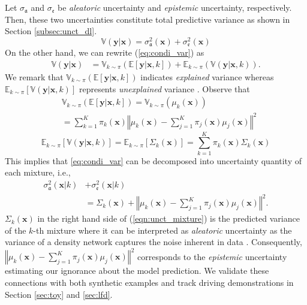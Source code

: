 \documentclass[letterpaper, 10 pt, conference]{ieeeconf}  %
\def\Bx{\mathbf{x}} \def\By{\mathbf{y}} \def\Bp{\mathbf{p}}
\begin{document}
Let $\sigma_{\mathfrak{a}}$ and 
$\sigma_{\mathfrak{e}}$ be \textit{aleatoric} uncertainty 
and \textit{epistemic} uncertainty, respectively. 
Then, these two uncertainties constitute total predictive variance
as shown in Section \ref{subsec:unct_dl}. 
\[
	\mathbb{V}(\mathbf{y}|\mathbf{x})
		=\sigma_{\mathfrak{a}}^{2}(\mathbf{x})
		+\sigma_{\mathfrak{e}}^{2}(\mathbf{x})
\]
On the other hand, we can rewrite (\ref{eq:condi_var}) as
\begin{align*}
	\mathbb{V}\left(\mathbf{y}|\mathbf{x}\right) 
		& = \mathbb{V}_{k\sim\pi}
			\left(\mathbb{E}\left[\mathbf{y}|\mathbf{x},k\right]\right)
		+\mathbb{E}_{k\sim\pi}
			\left(\mathbb{V}\left(\mathbf{y}|\mathbf{x},k\right)\right).
\end{align*}
We remark that 
$\mathbb{V}_{k\sim\pi}(\mathbb{E}[\mathbf{y}|\mathbf{x},k])$
indicates \emph{explained} variance 
whereas $\mathbb{E}_{k\sim\pi}\left[\mathbb{V}(\mathbf{y}|\mathbf{x},k)\right]$
represents \emph{unexplained} variance \cite{Duda_73}.
Observe that
\begin{align} 
	&
	\mathbb{V}_{k\sim\pi}(\mathbb{E}[\mathbf{y}|\mathbf{x},k])
	= 
	\mathbb{V}_{k\sim\pi}\left(\mu_{k}(\mathbf{x})\right) 
	\nonumber
	\\
	 &=
	 \sum_{k=1}^{K}\pi_{k}(\mathbf{x})
		\left\Vert 
			\mu_{k}(\mathbf{x})-\sum_{j=1}^{K}\pi_{j}(\mathbf{x})\mu_{j}(\mathbf{x})
		\right\Vert ^{2} 
	 \label{eqn:ve}	
\end{align} 
\begin{equation}
	\mathbb{E}_{k\sim\pi}[\mathbb{V}(\mathbf{y}|\mathbf{x},k)]
		=
		\mathbb{E}_{k\sim\pi} \left[\Sigma_{k}(\Bx) \right]
		=
		\sum_{k=1}^{K}\pi_{k}(\mathbf{x})\Sigma_{k}(\mathbf{x})
	\label{eqn:ev}	
\end{equation}
This implies that \eqref{eq:condi_var} can be decomposed into uncertainty
quantity of each mixture, i.e., 
\begin{align} 
	\sigma_{\mathfrak{a}}^{2}(\mathbf{x}|k)
	&+
	\sigma_{\mathfrak{e}}^{2}(\mathbf{x}|k)
	\nonumber
	\\ 
	&=
	\Sigma_{k}(\mathbf{x})
	+
		\left\Vert \mu_{k}(\mathbf{x})
		-\sum_{j=1}^{K}\pi_{j}(\mathbf{x})\mu_{j}(\mathbf{x})\right\Vert ^{2}.
	\label{eqn:unct_mixture}
\end{align}
$\Sigma_k(\Bx)$ in the right hand side of (\ref{eqn:unct_mixture})
is the predicted variance of the $k$-th mixture 
where it can be interpreted as \textit{aleatoric} uncertainty
as the variance of a density network captures the noise
inherent in data \cite{Kahn_17}. 
Consequently, 
$
\left\Vert \mu_{k}(\mathbf{x})
		-\sum_{j=1}^{K}\pi_{j}(\mathbf{x})\mu_{j}(\mathbf{x})\right\Vert ^{2}
$
corresponds to the \textit{epistemic} uncertainty estimating 
our ignorance about the model prediction. 
We validate these connections
with both synthetic examples and track driving demonstrations
in Section \ref{sec:toy} and \ref{sec:lfd}. 
\end{document}
